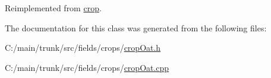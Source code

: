 Reimplemented from \hyperlink{classcrop_a9ed02462e332fffb65498075e7499bf4}{crop}.

The documentation for this class was generated from the following files:\begin{DoxyCompactItemize}
\item 
C:/main/trunk/src/fields/crops/\hyperlink{crop_oat_8h}{cropOat.h}\item 
C:/main/trunk/src/fields/crops/\hyperlink{crop_oat_8cpp}{cropOat.cpp}\end{DoxyCompactItemize}
